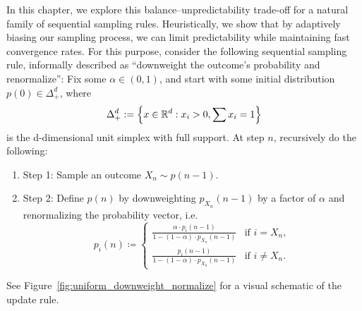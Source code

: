 In this chapter, we explore this balance--unpredictability trade-off for a 
natural family of sequential sampling rules. Heuristically, we show that by adaptively 
biasing our sampling process, we can limit predictability while maintaining fast 
convergence rates. For this purpose, consider the following sequential sampling rule, 
informally described as ``downweight the outcome's probability and renormalize'': Fix some 
$\alpha \in (0,1)$, and start with some initial distribution $p(0) \in \Delta_+^d$, 
where
%
    \[\Delta_+^d := \Big\{x \in \mathbb{R}^d : x_i > 0, \sum x_i = 1\Big\}\]
%
\noindent is the d-dimensional unit simplex with full support. At step $n$, recursively do the following:
\begin{enumerate}
    \item[] Step 1: Sample an outcome $X_n \sim p(n-1)$.
    \item[] Step 2: Define $p(n)$ by downweighting $p_{X_n}(n-1)$ by a factor of $\alpha$ and renormalizing the probability vector, i.e.
    $$p_{i}(n) \coloneqq \begin{cases}
            \frac{\alpha \cdot p_{i}(n-1)}{1- (1-\alpha) \cdot p_{X_n}(n-1)} & \text{if $i = X_n$}, \\[5pt]
            \frac{p_{i}(n-1)}{1 - (1-\alpha) \cdot p_{X_n}(n-1)} & \text{if $i \neq X_n$}.
        \end{cases}$$
\end{enumerate}
See Figure~\ref{fig:uniform_downweight_normalize} for a visual schematic of the update rule.

